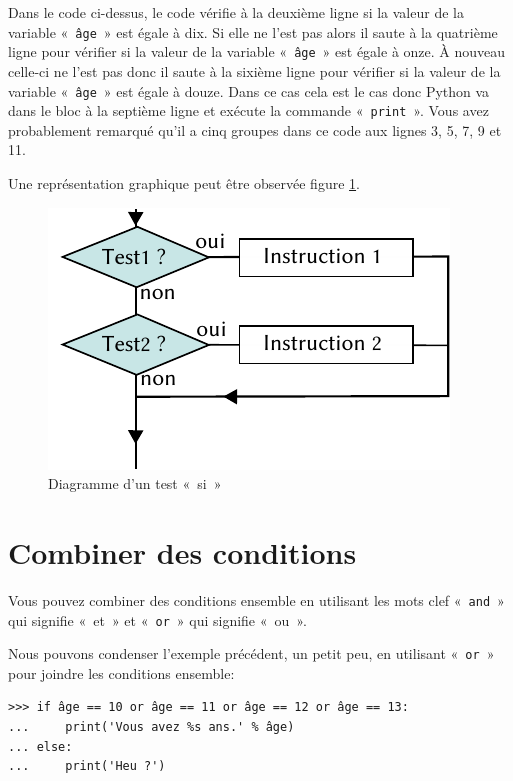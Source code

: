 Dans le code ci-dessus, le code vérifie à la deuxième ligne si la valeur de la variable «~\texttt{âge}~» est égale à dix.
Si elle ne l'est pas alors il saute à la quatrième ligne pour vérifier si 
la valeur de la variable «~\texttt{âge}~» est égale à onze. À nouveau  celle-ci     ne l'est pas donc il saute à la sixième ligne  pour vérifier si 
la valeur de la variable «~\texttt{âge}~» est égale à douze. Dans ce cas cela est le cas donc Python va dans le bloc à la septième ligne et exécute la commande «~\texttt{print}~».
Vous avez probablement remarqué qu'il a cinq groupes dans ce code aux lignes 3, 5, 7, 9 et 11.

Une représentation graphique peut être observée figure \ref{fig:Cf-elif-fr}.

\begin{figure}[ht]
\centering
\includegraphics[scale=1.5]{images/Cf-elif-fr.pdf}
\caption{Diagramme d'un test «~si~»}
\label{fig:Cf-elif-fr}
\end{figure}

\section{Combiner des conditions}
Vous pouvez combiner des conditions ensemble en utilisant les mots clef «~\texttt{and}~» qui signifie «~et~» et «~\texttt{or}~» qui signifie «~ou~».

Nous pouvons condenser l'exemple précédent, un petit peu, en utilisant «~\texttt{or}~» pour joindre les conditions ensemble:

\begin{Verbatim}[frame=single,rulecolor=\color{green}, label=à taper avec attention]
>>> if âge == 10 or âge == 11 or âge == 12 or âge == 13:
...     print('Vous avez %s ans.' % âge)
... else:
...     print('Heu ?')
\end{Verbatim}

